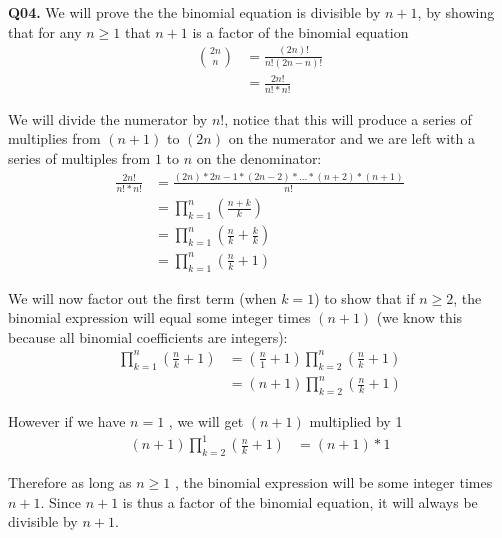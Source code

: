 \documentclass[11pt]{article}
\begin{document}
\textbf{Q04.} We will prove the the binomial equation is divisible by $n+1$, by showing that for any $n\geq1$ that $n+1$ is a factor of the binomial equation
\begin{align*}
\binom{2n}{n} & = \frac{(2n)!}{n!(2n-n)!}\\
&= \frac{2n!}{n!*n!}
\end{align*}

We will divide the numerator by $n!$, notice that this will produce a series of multiplies from $(n+1)$ to $(2n)$ on the numerator and we are left with a series of multiples from $1$ to $n$ on the denominator:
\begin{align*}
\frac{2n!}{n!*n!} &= \frac{(2n)*2n-1*(2n-2)*...*(n+2)*(n+1)}{n!}\\
&= \prod_{k=1}^{n}(\frac{n+k}{k})\\
&= \prod_{k=1}^{n}(\frac{n}{k}+\frac{k}{k})\\
&= \prod_{k=1}^{n}(\frac{n}{k}+1)
\end{align*}

We will now factor out the first term (when $k = 1$) to show that if $n\geq 2$, the binomial expression will equal some integer times $(n+1)$  (we know this because all binomial coefficients are integers):
\begin{align*}
\prod_{k=1}^{n}(\frac{n}{k}+1) & = (\frac{n}{1} + 1) \prod_{k=2}^{n}(\frac{n}{k}+1)\\
&=  (n + 1) \prod_{k=2}^{n}(\frac{n}{k}+1)
\end{align*}

However if we have $n = 1$ , we will get $(n+1)$ multiplied by 1
\begin{align*}
(n + 1) \prod_{k=2}^{1}(\frac{n}{k}+1) & = (n+1)* 1
\end{align*}

Therefore as long as $ n \geq 1 $ , the binomial expression will be some integer times $n+1$. Since $n+1$ is thus a factor of the binomial equation, it will always be divisible by $n+1$.\\
\end{document}
